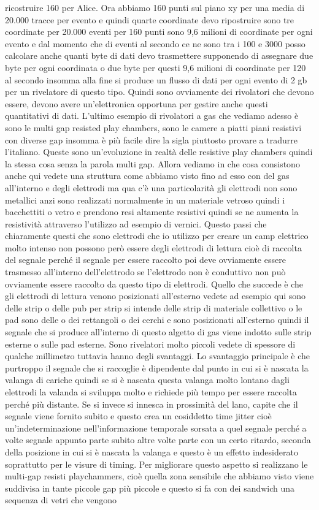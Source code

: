 ricostruire 160 per Alice. Ora abbiamo 160 punti sul piano xy per una media di 20.000 tracce per evento e quindi quarte coordinate devo ripostruire sono tre coordinate per 20.000 eventi per 160 punti sono 9,6 milioni di coordinate per ogni evento e dal momento che di eventi al secondo ce ne sono tra i 100 e 3000 posso calcolare anche quanti byte di dati devo trasmettere supponendo di assegnare due byte per ogni coordinata o due byte per questi 9,6 milioni di coordinate per 120 al secondo insomma alla fine si produce un flusso di dati per ogni evento di 2 gb per un rivelatore di questo tipo. Quindi sono ovviamente dei rivolatori che devono essere, devono avere un'elettronica opportuna per gestire anche questi quantitativi di dati. L'ultimo esempio di rivolatori a gas che vediamo adesso è sono le multi gap resisted play chambers, sono le camere a piatti piani resistivi con diverse gap insomma è più facile dire la sigla piuttosto provare a tradurre l'italiano. Queste sono un'evoluzione in realtà delle resistive play chambers quindi la stessa cosa senza la parola multi gap. Allora vediamo in che cosa consistono anche qui vedete una struttura come abbiamo visto fino ad esso con del gas all'interno e degli elettrodi ma qua c'è una particolarità gli elettrodi non sono metallici anzi sono realizzati normalmente in un materiale vetroso quindi i bacchettiti o vetro e prendono resi altamente resistivi quindi se ne aumenta la resistività attraverso l'utilizzo ad esempio di vernici. Questo passi che chiaramente questi che sono elettrodi che io utilizzo per creare un camp elettrico molto intenso non possono però essere degli elettrodi di lettura cioè di raccolta del segnale perché il segnale per essere raccolto poi deve ovviamente essere trasmesso all'interno dell'elettrodo se l'elettrodo non è conduttivo non può ovviamente essere raccolto da questo tipo di elettrodi. Quello che succede è che gli elettrodi di lettura venono posizionati all'esterno vedete ad esempio qui sono delle strip o delle pub per strip si intende delle strip di materiale collettivo o le pad sono delle o dei rettangoli o dei cerchi e sono posizionati all'esterno quindi il segnale che si produce all'interno di questo algetto di gas viene indotto sulle strip esterne o sulle pad esterne. Sono rivelatori molto piccoli vedete di spessore di qualche millimetro tuttavia hanno degli svantaggi. Lo svantaggio principale è che purtroppo il segnale che si raccoglie è dipendente dal punto in cui si è nascata la valanga di cariche quindi se si è nascata questa valanga molto lontano dagli elettrodi la valanda si sviluppa molto e richiede più tempo per essere raccolta perché più distante. Se si invece si innesca in prossimità del lano, capite che il segnale viene fornito subito e questo crea un cosiddetto time jitter cioè un'indeterminazione nell'informazione temporale sorsata a quel segnale perché a volte segnale appunto parte subito altre volte parte con un certo ritardo, seconda della posizione in cui si è nascata la valanga e questo è un effetto indesiderato soprattutto per le visure di timing. Per migliorare questo aspetto si realizzano le multi-gap resisti playchammers, cioè quella zona sensibile che abbiamo visto viene suddivisa in tante piccole gap più piccole e questo si fa con dei sandwich una sequenza di vetri che vengono 